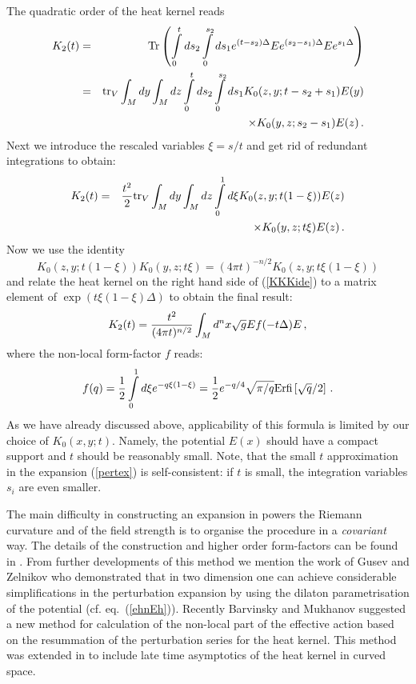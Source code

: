 The quadratic order of the heat kernel reads
\begin{eqnarray}
K_2(t)=&&{\rm Tr} \left( \int\limits_0^t ds_2 \int\limits_0^{s_2} ds_1
e^{(t-s_2)\Delta}E e^{(s_2-s_1)\Delta} E e^{s_1\Delta} \right) \nonumber \\
=&&{\rm tr}_V \int_M dy \int_M dz 
\int\limits_0^t ds_2 \int\limits_0^{s_2} ds_1 
K_0 (z,y;t-s_2+s_1)E(y)\nonumber\\
&&\qquad\qquad\qquad\qquad\qquad \times K_0(y,z;s_2-s_1)E(z) \,.\label{K2a}
\end{eqnarray}
Next we introduce the rescaled variables $\xi =s/t$ and get rid of redundant
integrations to obtain:
\begin{eqnarray}
K_2(t)=&&\frac {t^2}2 {\rm tr}_V \int_M dy \int_M dz \int\limits_0^1 d\xi
K_0(z,y;t(1-\xi )) E(z) \nonumber\\
&&\qquad\qquad\qquad\qquad\qquad 
\times K_0(y,z;t\xi)E(z) \,.\label{K2b}
\end{eqnarray}
Now we use the identity
\begin{equation}
K_0(z,y;t(1-\xi )) K_0(y,z;t\xi)=(4\pi t)^{-n/2}
K_0(z,y;t\xi(1-\xi)) \label{KKKide}
\end{equation}
and relate the heat kernel on the right hand side of (\ref{KKKide})
to a matrix element of $\exp (t\xi(1-\xi )\Delta )$ to obtain
the final result:
\begin{equation}
K_2(t)=\frac{t^2}{(4\pi t)^{n/2}}
\int_M d^nx\sqrt{g} E f(-t\Delta ) E \,,\label{Ktwo}
\end{equation}
where the non-local form-factor $f$ reads:
\begin{equation}
f(q)=\frac 12 \int\limits_0^1 d\xi e^{-q\xi (1-\xi)}=
\frac 12 e^{-q/4} \sqrt{\pi /q} {\rm Erfi} \left[ \sqrt{q}/2 \right]\,.
\end{equation}
As we have already discussed above, applicability of this formula is
limited by our choice of $K_0(x,y;t)$. Namely, the potential $E(x)$
should have a compact support and $t$ should be reasonably small.
Note, that the small $t$ approximation in the expansion (\ref{pertex})
is self-consistent: if $t$ is small, the integration variables $s_i$
are even smaller.

The main difficulty in constructing an expansion in powers
the Riemann curvature and of the field strength is to organise
the procedure in a {\it covariant} way. The details of the
construction and higher order form-factors can be found in  
\cite{Barvinsky:1987uw,Barvinsky:1990up,Barvinsky:1990uq,Barvinsky:1994hw,
Barvinsky:1994ic}. From further developments of this method
we mention the work of Gusev and Zelnikov \cite{Gusev:1999cv}
who demonstrated that in two dimension one can achieve considerable
simplifications in the perturbation expansion by using the dilaton
parametrisation of the potential (cf. eq.\ (\ref{ehnEh})).
Recently Barvinsky and Mukhanov \cite{Barvinsky:2002uf} suggested
a new method for calculation of the non-local part of the effective
action based on the resummation of the perturbation series for the
heat kernel. This method was extended in \cite{Barvinsky:2003rx} to
include late time asymptotics of the heat kernel in curved space.

